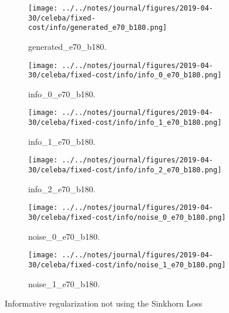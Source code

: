 \begin{figure}[!htbp]
   \centering
\begin{subfigure}[t]{0.98\textwidth}
   \texttt{[image: ../../notes/journal/figures/2019-04-30/celeba/fixed-cost/info/generated\_e70\_b180.png]}
   \caption{generated_e70_b180.}
   \label{fig:.._.._notes_journal_figures_2019-04-30_celeba_fixed-cost_info-a}
\end{subfigure}
\begin{subfigure}[t]{0.98\textwidth}
   \texttt{[image: ../../notes/journal/figures/2019-04-30/celeba/fixed-cost/info/info\_0\_e70\_b180.png]}
   \caption{info_0_e70_b180.}
   \label{fig:.._.._notes_journal_figures_2019-04-30_celeba_fixed-cost_info-b}
\end{subfigure}
\begin{subfigure}[t]{0.98\textwidth}
   \texttt{[image: ../../notes/journal/figures/2019-04-30/celeba/fixed-cost/info/info\_1\_e70\_b180.png]}
   \caption{info_1_e70_b180.}
   \label{fig:.._.._notes_journal_figures_2019-04-30_celeba_fixed-cost_info-c}
\end{subfigure}
\begin{subfigure}[t]{0.98\textwidth}
   \texttt{[image: ../../notes/journal/figures/2019-04-30/celeba/fixed-cost/info/info\_2\_e70\_b180.png]}
   \caption{info_2_e70_b180.}
   \label{fig:.._.._notes_journal_figures_2019-04-30_celeba_fixed-cost_info-d}
\end{subfigure}
\begin{subfigure}[t]{0.98\textwidth}
   \texttt{[image: ../../notes/journal/figures/2019-04-30/celeba/fixed-cost/info/noise\_0\_e70\_b180.png]}
   \caption{noise_0_e70_b180.}
   \label{fig:.._.._notes_journal_figures_2019-04-30_celeba_fixed-cost_info-e}
\end{subfigure}
\begin{subfigure}[t]{0.98\textwidth}
   \texttt{[image: ../../notes/journal/figures/2019-04-30/celeba/fixed-cost/info/noise\_1\_e70\_b180.png]}
   \caption{noise_1_e70_b180.}
   \label{fig:.._.._notes_journal_figures_2019-04-30_celeba_fixed-cost_info-f}
\end{subfigure}
   \caption{Informative regularization not using the Sinkhorn Loss}
   \label{fig:.._.._notes_journal_figures_2019-04-30_celeba_fixed-cost_info}
\end{figure}